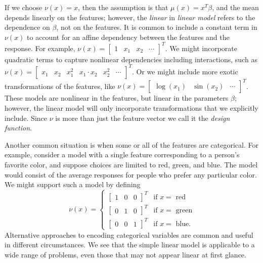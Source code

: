 \documentclass[12pt]{article}
\begin{document}
If we choose $\nu(x) = x$, then the assumption is that $\mu(x) = x^T \beta$, and the mean depends linearly on the features; however, the \textit{linear} in \textit{linear model} refers to the dependence on $\beta$, not on the features. It is common to include a constant term in $\nu(x)$ to account for an affine dependency between the features and the response. For example, $\nu(x) = \begin{bmatrix} 1 & x_1 & x_2 & \cdots \end{bmatrix}^T$. We might incorporate quadratic terms to capture nonlinear dependencies including interactions, such as $\nu(x) = \begin{bmatrix}x_1 & x_2 & x_1^2 & x_1 \cdot x_2 & x_2^2 & \cdots \end{bmatrix}^T$. Or we might include more exotic transformations of the features, like $\nu(x) = \begin{bmatrix} \log(x_1) & \sin(x_2) & \cdots \end{bmatrix}^T$. These models are nonlinear in the features, but linear in the parameters $\beta$; however, the linear model will only incorporate transformations that we explicitly include. Since $\nu$ is more than just the feature vector we call it the \emph{design function}.

Another common situation is when some or all of the features are categorical. For example, consider a model with a single feature corresponding to a person's favorite color, and suppose choices are limited to red, green, and blue. The model would consist of the average responses for people who prefer any particular color. We might support such a model by defining
\begin{displaymath}
   \nu(x) = \begin{cases}
       \begin{bmatrix} 1 & 0 & 0 \end{bmatrix}^T & \textrm{if $x = $ red} \\
       \begin{bmatrix} 0 & 1 & 0 \end{bmatrix}^T & \textrm{if $x = $ green} \\
       \begin{bmatrix} 0 & 0 & 1 \end{bmatrix}^T & \textrm{if $x = $ blue.}
   \end{cases}
\end{displaymath}
Alternative approaches to encoding categorical variables are common and useful in different circumstances. We see that the simple linear model is applicable to a wide range of problems, even those that may not appear linear at first glance.
\end{document}
